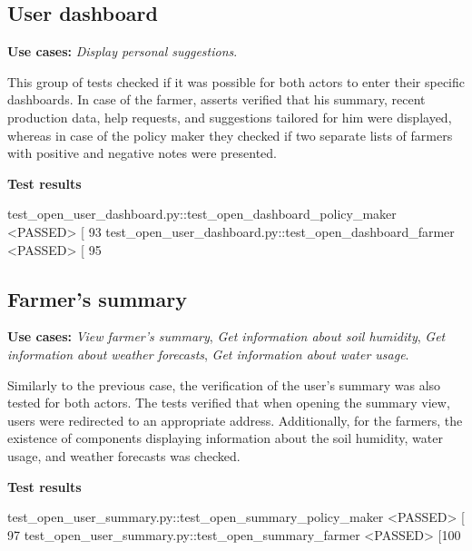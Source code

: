 \subsection{User dashboard}

\textbf{Use cases:} \textit{Display personal suggestions}.

This group of tests checked if it was possible for both actors to enter their specific dashboards. In case of the farmer, asserts verified that his summary, recent production data, help requests, and suggestions tailored for him were displayed, whereas in case of the policy maker they checked if two separate lists of farmers with positive and negative notes were presented.

\textbf{Test results}
\begin{verbnobox}[\footnotesize \vbdelim]
test_open_user_dashboard.py::test_open_dashboard_policy_maker <PASSED>     [ 93%
test_open_user_dashboard.py::test_open_dashboard_farmer <PASSED>           [ 95%
\end{verbnobox}

\subsection{Farmer's summary}

\textbf{Use cases:} \textit{View farmer's summary}, \textit{Get information about soil humidity}, \textit{Get information about weather forecasts}, \textit{Get information about water usage}.

Similarly to the previous case, the verification of the user's summary was also tested for both actors. The tests verified that when opening the summary view, users were redirected to an appropriate address. Additionally, for the farmers, the existence of components displaying information about the soil humidity, water usage, and weather forecasts was checked.

\textbf{Test results}
\begin{verbnobox}[\footnotesize \vbdelim]
test_open_user_summary.py::test_open_summary_policy_maker <PASSED>         [ 97%
test_open_user_summary.py::test_open_summary_farmer <PASSED>               [100%
\end{verbnobox}